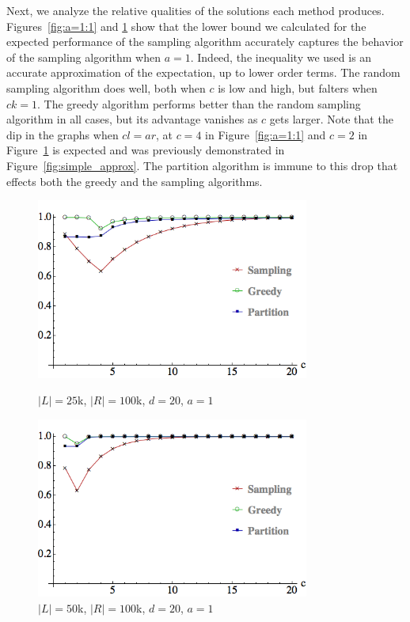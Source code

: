 \vs
Next, we analyze the relative qualities of the solutions each method produces.
Figures~\ref{fig:a=1:1} and \ref{fig:a=1:2} show that the
lower bound we calculated for the expected performance of the sampling
algorithm accurately captures the behavior of the sampling algorithm
when $a=1$. Indeed, the inequality we used is an accurate
approximation of the expectation, up to lower order terms. The random
sampling algorithm does well, both when $c$ is low and high, but
falters when $ck=1$. The greedy algorithm performs better than the
random sampling algorithm in all cases, but its advantage vanishes as
$c$ gets larger. Note that the dip in the graphs when $cl=ar$, at
$c=4$ in Figure~\ref{fig:a=1:1} and $c=2$ in Figure~\ref{fig:a=1:2} is
expected and was previously demonstrated in Figure~\ref{fig:simple_approx}.
The partition algorithm is immune to this drop that effects both the greedy
and the sampling algorithms. 

\begin{figure}[t]
\centering
\begin{minipage}[h]{0.48\textwidth}
\centering
\includegraphics[width=0.8\textwidth]{images/l=25000,r=100000_Greedy_vs_Naive.png}
\caption{$|L|=25$k, $|R|=100$k, $d=20$, $a=1$}\label{fig:a=1:1}
\end{minipage}
\hspace{0cm}
\begin{minipage}[h]{0.48\textwidth}
\centering
\includegraphics[width=0.8\textwidth]{images/l=50000,r=100000_Greedy_vs_Naive.png}
\caption{$|L|=50$k, $|R|=100$k, $d=20$, $a=1$}\label{fig:a=1:2}
\end{minipage}
\vspace{-0.2in}
\end{figure}


